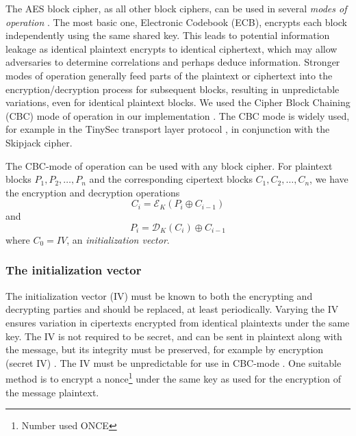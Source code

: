 The AES block cipher, as all other block ciphers, can be used in several \textit{modes of operation} . The most basic one, Electronic Codebook (ECB), encrypts each block independently using the same shared key.  This leads to potential information leakage as identical plaintext encrypts to identical ciphertext, which may allow adversaries to determine correlations and perhaps deduce information. Stronger modes of operation generally feed parts of the plaintext or ciphertext into the encryption/decryption process for subsequent blocks, resulting in unpredictable variations, even for identical plaintext blocks. We used the Cipher Block Chaining (CBC) mode of operation in our implementation . The CBC mode is widely used, for example in the TinySec transport layer protocol , in conjunction with the Skipjack cipher.

The CBC-mode of operation can be used with any block cipher. For plaintext blocks $P_1, P_2, \dots, P_n$ and the corresponding cipertext blocks $C_1, C_2, \dots, C_n$, we have the encryption and decryption operations
\[
C_i = \mathcal{E}_K(P_i \oplus C_{i-1})
\]
and 
\[
P_i = \mathcal{D}_K(C_i) \oplus C_{i-1}
\]
where $C_0=IV$, an \textit{initialization vector}. 

\subsubsection{The initialization vector}

The initialization vector (IV) must be known to both the encrypting and decrypting parties and should be replaced, at least periodically. Varying the IV ensures variation in cipertexts encrypted from identical plaintexts under the same key. The IV is not required to be secret, and can be sent in plaintext along with the message, but its integrity must be preserved, for example by encryption (secret IV) . The IV must be unpredictable for use in CBC-mode . One suitable method is to encrypt a nonce\footnote{Number used ONCE} under the same key as used for the encryption of the message plaintext. 

